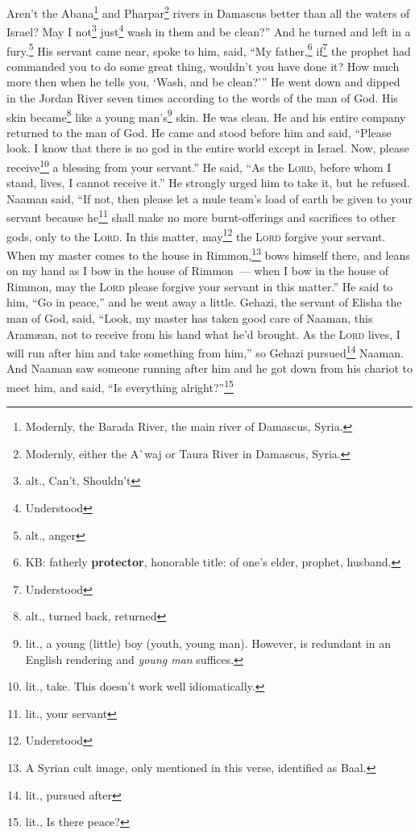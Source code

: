 \begin{inparaenum}
     Aren't the Abana\footnote{Modernly, the Barada River, the main river of Damascus, Syria.} and Pharpar\footnote{Modernly, either the A\`{}waj or Taura River in Damascus, Syria.} rivers in Damascus better than all the waters of Israel? May I not\footnote{alt., Can't, Shouldn't} just\footnote{Understood} wash in them and be clean?'' And he turned and left in a fury.\footnote{alt., anger}%
     His servant came near, spoke to him, said, ``My father,\footnote{KB: fatherly \textbf{protector}, honorable title: of one's elder, prophet, husband.} if\footnote{Understood} the prophet had commanded you to do some great thing, wouldn't you have done it? How much more then when he tells you, `Wash, and be clean?'\thinspace''%
     He went down and dipped in the Jordan River seven times according to the words of the man of God. His skin became\footnote{alt., turned back, returned} like a young man's\footnote{lit., a young (little) boy (youth, young man). However,  is redundant in an English rendering and \textit{young man} suffices.} skin. He was clean.%
     He and his entire company returned to the man of God. He came and stood before him and said, ``Please look. I know that there is no god in the entire world except in Israel. Now, please receive\footnote{lit., take. This doesn't work well idiomatically.} a blessing from your servant.''%
     He said, ``As the \textsc{Lord}, before whom I stand, lives, I cannot receive it.'' He strongly urged him to take it, but he refused.%
     Naaman said, ``If not, then please let a mule team's load of earth be given to your servant because he\footnote{lit., your servant} shall make no more burnt-offerings and sacrifices to other gods, only to the \textsc{Lord}.%
     In this matter, may\footnote{Understood} the \textsc{Lord} forgive your servant. When my master comes to the house in Rimmon,\footnote{A Syrian cult image, only mentioned in this verse, identified as Baal.} bows himself there, and leans on my hand as I bow in the house of Rimmon~--- when I bow in the house of Rimmon, may the \textsc{Lord} please forgive your servant in this matter.''%
     He said to him, ``Go in peace,'' and he went away a little.%
     Gehazi, the servant of Elisha the man of God, said, ``Look, my master has taken good care of Naaman, this Aram\ae{}an, not to receive from his hand what he'd brought. As the \textsc{Lord} lives, I will run after him and take something from him,''%
     so Gehazi pursued\footnote{lit., pursued after} Naaman. And Naaman saw someone running after him and he got down from his chariot to meet him, and said, ``Is everything alright?''\footnote{lit., Is there peace?}%

\end{inparaenum}
